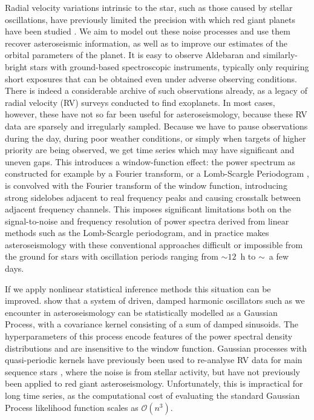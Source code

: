 \documentclass[modern]{aastex61}
\begin{document}
Radial velocity variations intrinsic to the star, such as those caused by stellar oscillations, have previously limited the precision with which red giant planets have been studied \citep{2005PASJ...57...97S}. We aim to model out these noise processes and use them recover asteroseismic information, as well as to improve our estimates of the orbital parameters of the planet. It is easy to observe Aldebaran and similarly-bright stars with ground-based spectroscopic instruments, typically only requiring short exposures that can be obtained even under adverse observing conditions. There is indeed a considerable archive of such observations already, as a legacy of radial velocity (RV) surveys conducted to find exoplanets. In most cases, however, these have not so far been useful for asteroseismology, because these RV data are sparsely and irregularly sampled. Because we have to pause observations during the day, during poor weather conditions, or simply when targets of higher priority are being observed, we get time series which may have significant and uneven gaps. This introduces a window-function effect: the power spectrum as constructed for example by a Fourier transform, or a Lomb-Scargle Periodogram \citep{lomb,scargle}, is convolved with the Fourier transform of the window function, introducing strong sidelobes adjacent to real frequency peaks and causing crosstalk between adjacent frequency channels. This imposes significant limitations both on the signal-to-noise and frequency resolution of power spectra derived from linear methods such as the Lomb-Scargle periodogram, and in practice makes asteroseismology with these conventional approaches difficult or impossible from the ground for stars with oscillation periods ranging from $\sim 12$~h to $\sim$~a few days.

If we apply nonlinear statistical inference methods this situation can be
improved. \citet{brewer2009} show that a system of driven, damped harmonic
oscillators such as we encounter in asteroseismology can be statistically
modelled as a Gaussian Process, with a covariance kernel consisting of a sum of
damped sinusoids. The hyperparameters of this process encode features of the
power spectral density distributions and are insensitive to the window function. Gaussian processes with quasi-periodic kernels have previously been used to re-analyse RV data for main sequence stars \citep{2014MNRAS.443.2517H,2015MNRAS.452.2269R}, where the noise is from stellar activity, but have not previously been applied to red giant asteroseismology.
Unfortunately, this is impractical for long time series, as the computational
cost of evaluating the standard Gaussian Process likelihood function scales as
$\mathcal{O}(n^3)$. 
\end{document}
